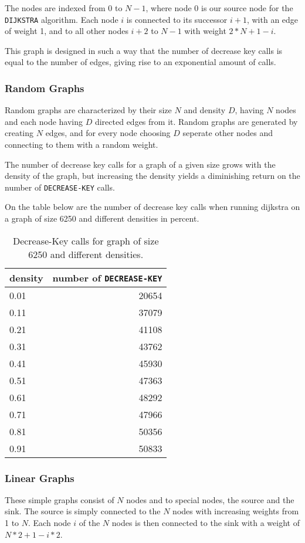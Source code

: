 \documentclass[a4paper,oneside,11pt]{article}
\begin{document}
\begin{itemize}
The nodes are indexed from 0 to $N-1$, where node 0 is our source node for the \texttt{DIJKSTRA} algorithm. Each node $i$ is connected to its successor $i+1$, with an edge of weight 1, and to all other nodes $i+2$ to $N-1$ with weight $2*N+1-i$.

This graph is designed in such a way that the number of decrease key calls is equal to the number of edges, giving rise to an exponential amount of calls.

\subsubsection*{Random Graphs}
Random graphs are characterized by their size $N$ and density $D$, having $N$ nodes and each node having $D$ directed edges from it. Random graphs are generated by creating $N$ edges, and for every node choosing $D$ seperate other nodes and connecting to them with a random weight.

The number of decrease key calls for a graph of a given size grows with the density of the graph, but increasing the density yields a diminishing return on the number of \texttt{DECREASE\--KEY} calls. 

On the table below are the number of decrease key calls when running dijkstra on a graph of size 6250 and different densities in percent.

\begin{table}
  \begin{center}
    \begin{tabular}{l|r}
      density & number of \texttt{DECREASE\--KEY} \\
      \hline
      0.01 & 20654\\
      0.11 & 37079\\
      0.21 & 41108\\
      0.31 & 43762\\
      0.41 & 45930\\
      0.51 & 47363\\
      0.61 & 48292\\
      0.71 & 47966\\
      0.81 & 50356\\
      0.91 & 50833
    \end{tabular}
    \caption{Decrease-Key calls for graph of size 6250 and different densities.}
  \end{center}
\end{table}

\subsubsection*{Linear Graphs}
These simple graphs consist of $N$ nodes and to special nodes, the source and the sink. The source is simply connected to the $N$ nodes with increasing weights from 1 to $N$. Each node $i$ of the $N$ nodes is then connected to the sink with a weight of $N*2 +1 - i*2$.


\end{itemize}
\end{document}
